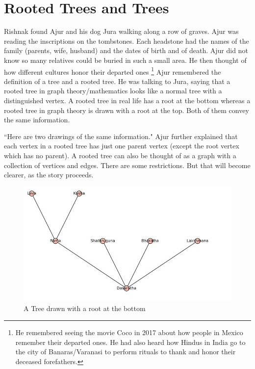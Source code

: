 \chapter{Rooted Trees and Trees}

Rishnak found Ajur and his dog Jura walking along a row of graves. Ajur was reading the inscriptions on the tombstones. Each headstone had the names of the family (parents, wife, husband) and the dates of birth and of death. Ajur did not know so many relatives could be buried in such a small area. He then thought of how different cultures honor their departed ones \footnote{He remembered seeing the movie Coco in 2017 about how people in Mexico remember their departed ones. He had also heard how Hindus in India go to the city of Banaras/Varanasi to perform rituals to thank and honor their deceased forefathers.} 
Ajur remembered the definition of a tree and a rooted tree. He was talking to Jura, saying that a rooted tree in graph theory/mathematics looks like a normal tree with a distinguished vertex. A rooted tree in real life has a root at the bottom whereas a rooted tree in graph theory is drawn with a root at the top. Both of them convey the same information.

``Here are two drawings of the same information." Ajur further explained that each vertex in a rooted tree has just one parent vertex (except the root vertex which has no parent). A rooted tree can also be thought of as a graph with a collection of vertices and edges. There are some restrictions. But that will become clearer, as the story proceeds.


\begin{figure}
\begin{center}
\includegraphics[width=\textwidth]{tree1.JPG}
\caption{A Tree drawn with a root at the bottom}\label{rg1}
\end{center}
\end{figure}

